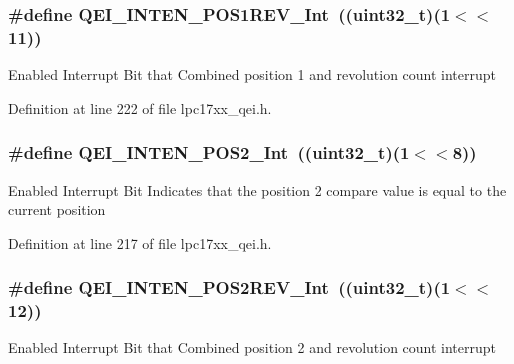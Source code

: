\hypertarget{group___q_e_i___private___macros_gad031abb8bd781ac182d2603f3a891fd7}{
\subsubsection[{\-Q\-E\-I\-\_\-\-I\-N\-T\-E\-N\-\_\-\-P\-O\-S1\-R\-E\-V\-\_\-\-Int}]{\setlength{\rightskip}{0pt plus 5cm}\#define {\bf \-Q\-E\-I\-\_\-\-I\-N\-T\-E\-N\-\_\-\-P\-O\-S1\-R\-E\-V\-\_\-\-Int}~((uint32\-\_\-t)(1$<$$<$11))}}\label{group___q_e_i___private___macros_gad031abb8bd781ac182d2603f3a891fd7}
\-Enabled \-Interrupt \-Bit that \-Combined position 1 and revolution count interrupt 

\-Definition at line 222 of file lpc17xx\-\_\-qei.\-h.

\hypertarget{group___q_e_i___private___macros_ga48414bd9f39eb5e0c25c42f94619cdb5}{
\subsubsection[{\-Q\-E\-I\-\_\-\-I\-N\-T\-E\-N\-\_\-\-P\-O\-S2\-\_\-\-Int}]{\setlength{\rightskip}{0pt plus 5cm}\#define {\bf \-Q\-E\-I\-\_\-\-I\-N\-T\-E\-N\-\_\-\-P\-O\-S2\-\_\-\-Int}~((uint32\-\_\-t)(1$<$$<$8))}}\label{group___q_e_i___private___macros_ga48414bd9f39eb5e0c25c42f94619cdb5}
\-Enabled \-Interrupt \-Bit \-Indicates that the position 2 compare value is equal to the current position 

\-Definition at line 217 of file lpc17xx\-\_\-qei.\-h.

\hypertarget{group___q_e_i___private___macros_gac33a0cb657e97f4191cbf21017a2b87f}{
\subsubsection[{\-Q\-E\-I\-\_\-\-I\-N\-T\-E\-N\-\_\-\-P\-O\-S2\-R\-E\-V\-\_\-\-Int}]{\setlength{\rightskip}{0pt plus 5cm}\#define {\bf \-Q\-E\-I\-\_\-\-I\-N\-T\-E\-N\-\_\-\-P\-O\-S2\-R\-E\-V\-\_\-\-Int}~((uint32\-\_\-t)(1$<$$<$12))}}\label{group___q_e_i___private___macros_gac33a0cb657e97f4191cbf21017a2b87f}
\-Enabled \-Interrupt \-Bit that \-Combined position 2 and revolution count interrupt 

